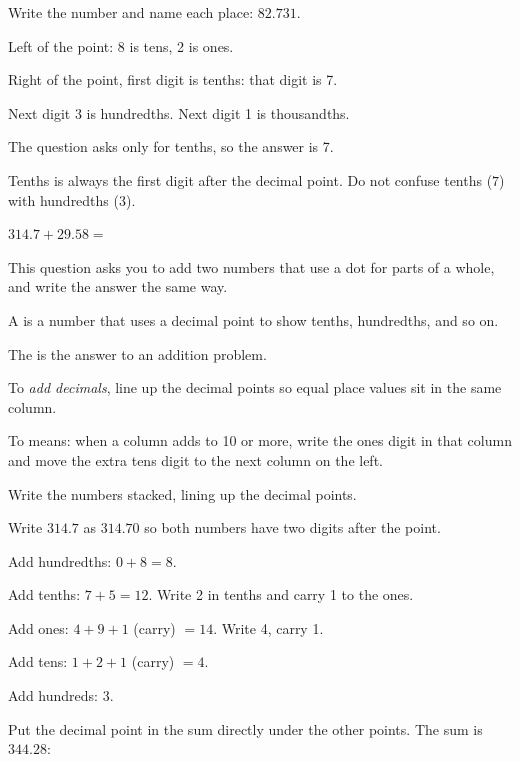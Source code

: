 \begin{steps}
  \item Write the number and name each place: $82.731$.
  \item Left of the point: 8 is tens, 2 is ones.
  \item Right of the point, first digit is tenths: that digit is 7.
  \item Next digit 3 is hundredths. Next digit 1 is thousandths.
  \item The question asks only for tenths, so the answer is 7.
\end{steps}


Tenths is always the first digit after the decimal point. Do not confuse tenths
($7$) with hundredths ($3$).


$314.7 + 29.58 = $\ansblank[1.8cm]


This question asks you to add two numbers that use a dot for parts of a whole,
and write the answer the same way.

\begin{words}
  \item A is a number that uses a decimal point to show tenths, hundredths, and so on.
  \item The is the answer to an addition problem.
  \item To \textit{add decimals}, line up the decimal points so equal place values sit in the same column.
  \item To means: when a column adds to 10 or more, write the ones digit
        in that column and move the extra tens digit to the next column on the left.
\end{words}

\begin{steps}
  \item Write the numbers stacked, lining up the decimal points.
  \item Write $314.7$ as $314.70$ so both numbers have two digits after the point.
  \item Add hundredths: $0 + 8 = 8$.
  \item Add tenths: $7 + 5 = 12$. Write 2 in tenths and carry 1 to the ones.
  \item Add ones: $4 + 9 + 1$ (carry) $= 14$. Write 4, carry 1.
  \item Add tens: $1 + 2 + 1$ (carry) $= 4$.
  \item Add hundreds: 3.
  \item Put the decimal point in the sum directly under the other points. The sum is $344.28$:
\end{steps}

